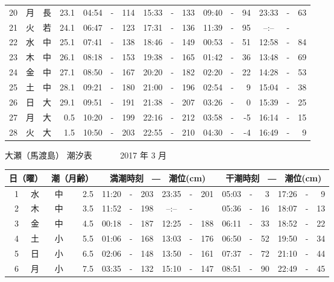 \documentclass[12pt.a4j]{jsarticle}
\begin{document}
\begin{center}
\begin{table}[ht]
\begin{tabular}{|rc|cr|ccrccr|ccrccr|}
20 & 月 & 長 & 23.1 &  04:54 &-& 114  &  15:33 &-& 133  &   09:40 &-&  94  &   23:33 &-&  63  \\
21 & 火 & 若 & 24.1 &  06:47 &-& 123  &  17:31 &-& 136  &   11:39 &-&  95  &   --:-- &-&     \\
22 & 水 & 中 & 25.1 &  07:41 &-& 138  &  18:46 &-& 149  &   00:53 &-&  51  &   12:58 &-&  84  \\
23 & 木 & 中 & 26.1 &  08:18 &-& 153  &  19:38 &-& 165  &   01:42 &-&  36  &   13:48 &-&  69  \\
24 & 金 & 中 & 27.1 &  08:50 &-& 167  &  20:20 &-& 182  &   02:20 &-&  22  &   14:28 &-&  53  \\
25 & 土 & 中 & 28.1 &  09:21 &-& 180  &  21:00 &-& 196  &   02:54 &-&   9  &   15:04 &-&  38  \\
26 & 日 & 大 & 29.1 &  09:51 &-& 191  &  21:38 &-& 207  &   03:26 &-&   0  &   15:39 &-&  25  \\
27 & 月 & 大 &  0.5 &  10:20 &-& 199  &  22:16 &-& 212  &   03:58 &-&  -5  &   16:14 &-&  15  \\
28 & 火 & 大 &  1.5 &  10:50 &-& 203  &  22:55 &-& 210  &   04:30 &-&  -4  &   16:49 &-&   9  \\
   \hline
   \end{tabular}
\end{table}
\newpage
 {\LARGE 大瀬（馬渡島）  潮汐表　　　}
 {\large 2017 年  3 月}\\
 \begin{table}[ht]
    \begin{tabular}{|rc|cr|ccrccr|ccrccr|}
    \hline
    \multicolumn{2}{|c|}{日（曜）} & \multicolumn{2}{c|}{潮（月齢）} & \multicolumn{6}{c|}{満潮時刻　―　潮位(cm)} & \multicolumn{6}{c|}{干潮時刻　―　潮位(cm)} \\
 \hline
 1 & 水 & 中 &  2.5 &  11:20 &-& 203  &  23:35 &-& 201  &   05:03 &-&   3  &   17:26 &-&   9  \\
 2 & 木 & 中 &  3.5 &  11:52 &-& 198  &  --:-- &-&     &   05:36 &-&  16  &   18:07 &-&  13  \\
 3 & 金 & 中 &  4.5 &  00:18 &-& 187  &  12:25 &-& 188  &   06:11 &-&  33  &   18:52 &-&  22  \\
 4 & 土 & 小 &  5.5 &  01:06 &-& 168  &  13:03 &-& 176  &   06:50 &-&  52  &   19:50 &-&  34  \\
 5 & 日 & 小 &  6.5 &  02:06 &-& 148  &  13:50 &-& 161  &   07:37 &-&  72  &   21:10 &-&  44  \\
 6 & 月 & 小 &  7.5 &  03:35 &-& 132  &  15:10 &-& 147  &   08:51 &-&  90  &   22:49 &-&  45  \\

\end{tabular}
\end{table}
\end{center}
\end{document}
